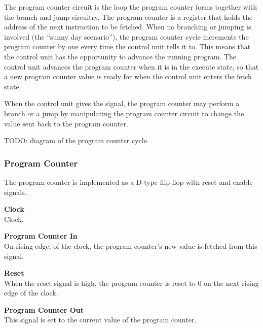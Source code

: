 The program counter circuit is the loop the program counter forms together with the branch and jump circuitry.
The program counter is a register that holds the address of the next instruction to be fetched.
When no branching or jumping is involved (the ``sunny day scenario''), the program counter cycle increments the program counter by one every time the control unit tells it to.
This means that the control unit has the opportunity to advance the running program.
The control unit advances the program counter when it is in the execute state, so that a new program counter value is ready for when the control unit enters the fetch state.

When the control unit gives the signal, the program counter may perform a branch or a jump by manipulating the program counter circuit to change the value sent back to the program counter.

TODO: diagram of the program counter cycle.

\subsubsection{Program Counter}

The program counter is implemented as a D-type flip-flop with reset and enable signals.


\begin{description}
\item{\textbf{Clock}} \\

Clock.

\item{\textbf{Program Counter In}} \\

On rising edge, of the clock, the program counter's new value is fetched from this signal.

\item{\textbf{Reset}} \\

When the reset signal is high, the program counter is reset to 0 on the next rising edge of the clock.

\end{description}


\begin{description}
\item{\textbf{Program Counter Out}} \\

This signal is set to the current value of the program counter.

\end{description}
